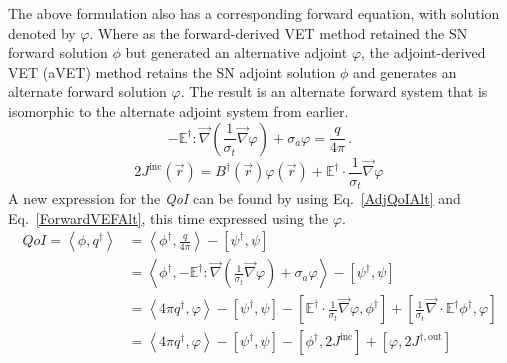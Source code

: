 \documentclass[12pt]{report}
\newcommand{\vr}{\vec{r}}
\newcommand{\bra}{\left\langle}
\newcommand{\ket}{\right\rangle}
\newcommand{\sbra}{\left[}
\newcommand{\sket}{\right]}
\renewcommand{\div}{\vec{\nabla} \cdot}
\newcommand{\grad}{\vec{\nabla}}
\newcommand{\Edd}{\mathbb{E}}
\newcommand{\BEdd}{B}
\newcommand{\sigt}{\sigma_t}
\newcommand{\siga}{\sigma_a}
\newcommand{\angSource}{\frac{q}{4 \pi}}
\newcommand{\scalResp}{q^\dag}
\newcommand{\qoi}{{\it QoI}\xspace}
\begin{document}
The above formulation also has a corresponding forward equation, with solution denoted by $\varphi$. Where as the forward-derived VET method retained the SN forward solution $\phi$ but generated an alternative adjoint $\varphi$, the adjoint-derived VET (aVET) method retains the SN adjoint solution $\phi$ and generates an alternate forward solution $\varphi$. The result is an alternate forward system that is isomorphic to the alternate adjoint system from earlier.
\begin{equation}
\label{ForwardVEFAlt}
- \Edd^\dag : \grad \left( \frac{1}{\sigt}\grad \varphi \right) + \siga \varphi  = \angSource  \,.
\end{equation}
\begin{equation}
2 J^{\text{inc}}(\vr) = \BEdd^\dag(\vr) \varphi(\vr) + \Edd^\dag \cdot \frac{1}{\sigt} \grad \varphi  \,
\end{equation} 
A new expression for the \qoi can be found by using Eq.~\eqref{AdjQoIAlt} and Eq.~\eqref{ForwardVEFAlt}, this time expressed using the $\varphi$.
 \begin{equation}
\label{AdjQoIAltExpand}
\begin{split}
QoI = \bra \phi , \scalResp \ket &= \bra \phi^\dag , \angSource \ket - \sbra \psi^\dag,  \psi \sket \\
&= \bra \phi^\dag , - \Edd^\dag : \grad \left( \frac{1}{\sigt}\grad \varphi \right) + \siga \varphi \ket - \sbra \psi^\dag,  \psi \sket \\
&= \bra 4\pi \scalResp  ,\varphi \ket - \sbra \psi^\dag,  \psi \sket  
- \sbra \Edd^\dag \cdot \frac{1}{\sigt}\grad \varphi,  \phi^\dag \sket 
+ \sbra \frac{1}{\sigt} \div \Edd^\dag \phi^\dag,  \varphi \sket \\
&=  \bra 4\pi \scalResp  ,\varphi \ket - \sbra \psi^\dag,  \psi \sket - \sbra \phi^\dag, 2J^{\text{inc}} \sket + \sbra \varphi , 2 J^{\dag,\text{out}} \sket
\end{split}
\end{equation}
\end{document}

